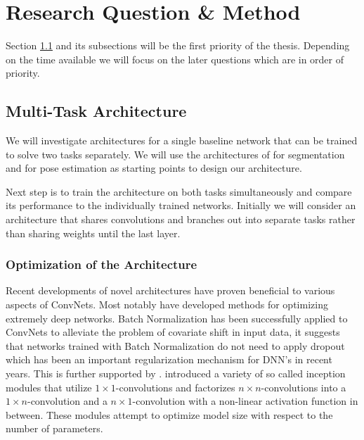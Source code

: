 \documentclass[a4paper,10pt]{article}
\begin{document}




\section{Research Question \& Method}

Section \ref{sec:arc:multi} and its subsections will be the first priority of the thesis.  Depending on the time available we will focus on the later questions which are in order of priority.


\subsection{Multi-Task Architecture}
\label{sec:arc:multi}
We will investigate architectures for a single baseline network that can be trained to solve two tasks separately.  We will use the architectures of \cite{Long2014,Noh2015} for segmentation and \cite{Tompson2015,Wei2016} for pose estimation as starting points to design our architecture.

Next step is to train the architecture on both tasks simultaneously and compare its performance to the individually trained networks.  Initially we will consider an architecture that shares convolutions and branches out into separate tasks rather than sharing weights until the last layer.



\subsubsection{Optimization of the Architecture}
\label{sec:arc:optimization}
Recent developments of novel architectures have proven beneficial to various aspects of ConvNets.  Most notably \cite{He2015,Srivastava2015} have developed methods for optimizing extremely deep networks.  Batch Normalization \cite{Ioffe2015} has been successfully applied to ConvNets to alleviate the problem of covariate shift in input data, it suggests that networks trained with Batch Normalization do not need to apply dropout \cite{Srivastava2014} which has been an important regularization mechanism for DNN's in recent years.  This is further supported by \cite{He2015}.  \cite{Szegedy2014,Szegedy2015} introduced a variety of so called inception modules that utilize $1\times 1$-convolutions and factorizes $n\times n$-convolutions into a $1\times n$-convolution and a $n\times 1$-convolution with a non-linear activation function in between.  These modules attempt to optimize model size with respect to the number of parameters.
\end{document}
